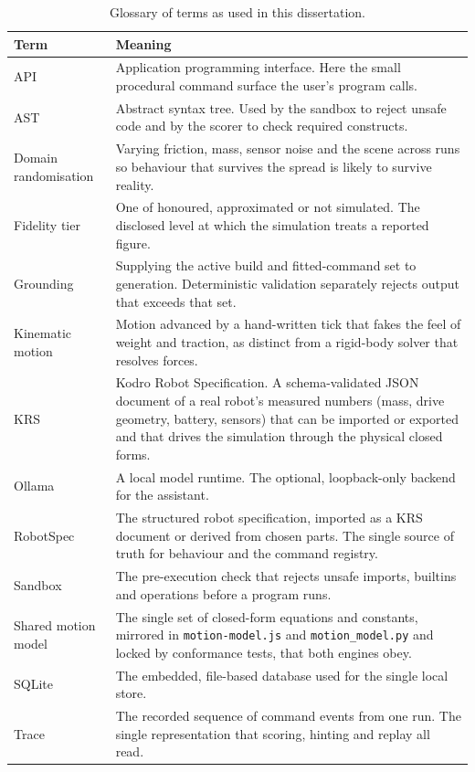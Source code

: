 \documentclass[11pt,a4paper]{report}
\begin{document}
\begin{table}[h]
\centering\small
\renewcommand{\arraystretch}{1.2}
\begin{tabular}{p{3.0cm}p{11.6cm}}
\toprule
Term & Meaning \\
\midrule
API & Application programming interface. Here the small procedural command surface the user's program calls. \\
AST & Abstract syntax tree. Used by the sandbox to reject unsafe code and by the scorer to check required constructs. \\
Domain randomisation & Varying friction, mass, sensor noise and the scene across runs so behaviour that survives the spread is likely to survive reality. \\
Fidelity tier & One of honoured, approximated or not simulated. The disclosed level at which the simulation treats a reported figure. \\
Grounding & Supplying the active build and fitted-command set to generation. Deterministic validation separately rejects output that exceeds that set. \\
Kinematic motion & Motion advanced by a hand-written tick that fakes the feel of weight and traction, as distinct from a rigid-body solver that resolves forces. \\
KRS & Kodro Robot Specification. A schema-validated JSON document of a real robot's measured numbers (mass, drive geometry, battery, sensors) that can be imported or exported and that drives the simulation through the physical closed forms. \\
Ollama & A local model runtime. The optional, loopback-only backend for the assistant. \\
RobotSpec & The structured robot specification, imported as a KRS document or derived from chosen parts. The single source of truth for behaviour and the command registry. \\
Sandbox & The pre-execution check that rejects unsafe imports, builtins and operations before a program runs. \\
Shared motion model & The single set of closed-form equations and constants, mirrored in \texttt{motion-model.js} and \texttt{motion\_model.py} and locked by conformance tests, that both engines obey. \\
SQLite & The embedded, file-based database used for the single local store. \\
Trace & The recorded sequence of command events from one run. The single representation that scoring, hinting and replay all read. \\
\bottomrule
\end{tabular}
\caption{Glossary of terms as used in this dissertation.}
\end{table}
\end{document}
